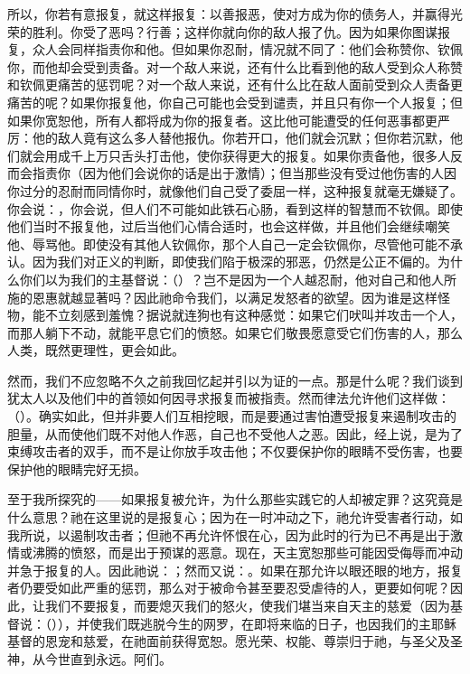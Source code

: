 所以，你若有意报复，就这样报复：以善报恶，使对方成为你的债务人，并赢得光荣的胜利。你受了恶吗？行善；这样你就向你的敌人报了仇。因为如果你图谋报复，众人会同样指责你和他。但如果你忍耐，情况就不同了：他们会称赞你、钦佩你，而他却会受到责备。对一个敌人来说，还有什么比看到他的敌人受到众人称赞和钦佩更痛苦的惩罚呢？对一个敌人来说，还有什么比在敌人面前受到众人责备更痛苦的呢？如果你报复他，你自己可能也会受到谴责，并且只有你一个人报复；但如果你宽恕他，所有人都将成为你的报复者。这比他可能遭受的任何恶事都更严厉：他的敌人竟有这么多人替他报仇。你若开口，他们就会沉默；但你若沉默，他们就会用成千上万只舌头打击他，使你获得更大的报复。如果你责备他，很多人反而会指责你（因为他们会说你的话是出于激情）；但当那些没有受过他伤害的人因你过分的忍耐而同情你时，就像他们自己受了委屈一样，这种报复就毫无嫌疑了。你会说：，你会说，但人们不可能如此铁石心肠，看到这样的智慧而不钦佩。即使他们当时不报复他，过后当他们心情合适时，也会这样做，并且他们会继续嘲笑他、辱骂他。即使没有其他人钦佩你，那个人自己一定会钦佩你，尽管他可能不承认。因为我们对正义的判断，即使我们陷于极深的邪恶，仍然是公正不偏的。为什么你们以为我们的主基督说：（）？岂不是因为一个人越忍耐，他对自己和他人所施的恩惠就越显著吗？因此祂命令我们，以满足发怒者的欲望。因为谁是这样怪物，能不立刻感到羞愧？据说就连狗也有这种感觉：如果它们吠叫并攻击一个人，而那人躺下不动，就能平息它们的愤怒。如果它们敬畏愿意受它们伤害的人，那么人类，既然更理性，更会如此。\par

然而，我们不应忽略不久之前我回忆起并引以为证的一点。那是什么呢？我们谈到犹太人以及他们中的首领如何因寻求报复而被指责。然而律法允许他们这样做：（）。确实如此，但并非要人们互相挖眼，而是要通过害怕遭受报复来遏制攻击的胆量，从而使他们既不对他人作恶，自己也不受他人之恶。因此，经上说，是为了束缚攻击者的双手，而不是让你放手攻击他；不仅要保护你的眼睛不受伤害，也要保护他的眼睛完好无损。\par

至于我所探究的——如果报复被允许，为什么那些实践它的人却被定罪？这究竟是什么意思？祂在这里说的是报复心；因为在一时冲动之下，祂允许受害者行动，如我所说，以遏制攻击者；但祂不再允许怀恨在心，因为此时的行为已不再是出于激情或沸腾的愤怒，而是出于预谋的恶意。现在，天主宽恕那些可能因受侮辱而冲动并急于报复的人。因此祂说：；然而又说：。如果在那允许以眼还眼的地方，报复者仍要受如此严重的惩罚，那么对于被命令甚至要忍受虐待的人，更要如何呢？因此，让我们不要报复，而要熄灭我们的怒火，使我们堪当来自天主的慈爱（因为基督说：（）），并使我们既逃脱今生的网罗，在即将来临的日子，也因我们的主耶稣基督的恩宠和慈爱，在祂面前获得宽恕。愿光荣、权能、尊崇归于祂，与圣父及圣神，从今世直到永远。阿们。\par

